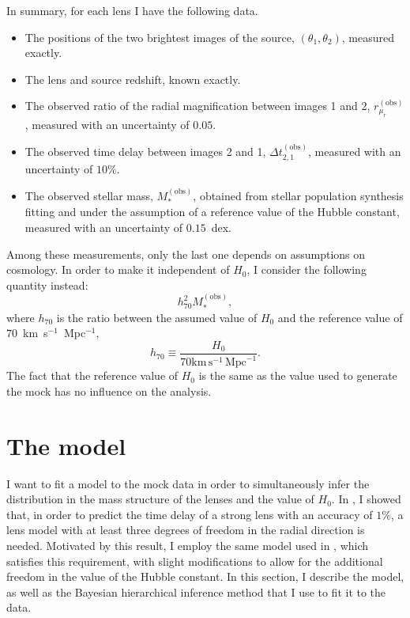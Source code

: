 \documentclass{aa}
\def\mobs{M_*^{\mathrm{(obs)}}}
\def\rmurobs{r_{\mu_r}^{(\mathrm{obs})}}
\begin{document}
In summary, for each lens I have the following data.
\begin{itemize}
\item The positions of the two brightest images of the source, $(\theta_1, \theta_2)$, measured exactly.
\item The lens and source redshift, known exactly.
\item The observed ratio of the radial magnification between images 1 and 2, $\rmurobs$, measured with an uncertainty of $0.05$.
\item The observed time delay between images 2 and 1, $\Delta t_{2,1}^{(\mathrm{obs})}$, measured with an uncertainty of $10\%$.
\item The observed stellar mass, $\mobs$, obtained from stellar population synthesis fitting and under the assumption of a reference value of the Hubble constant, measured with an uncertainty of $0.15$~dex.
\end{itemize}
Among these measurements, only the last one depends on assumptions on cosmology. In order to make it independent of $H_0$, I consider the following quantity instead:
\begin{equation}
h_{70}^2\mobs,
\end{equation}
where $h_{70}$ is the ratio between the assumed value of $H_0$ and the reference value of $70$~km~s$^{-1}$~Mpc$^{-1}$,
\begin{equation}
h_{70} \equiv \frac{H_0}{70\mathrm{km}\,\mathrm{s}^{-1}\,\mathrm{Mpc}^{-1}}.
\end{equation}
The fact that the reference value of $H_0$ is the same as the value used to generate the mock has no influence on the analysis.


\section{The model}\label{sect:model}

I want to fit a model to the mock data in order to simultaneously infer the distribution in the mass structure of the lenses and the value of $H_0$.
In \citet{Son18}, I showed that, in order to predict the time delay of a strong lens with an accuracy of $1\%$, a lens model with at least three degrees of freedom in the radial direction is needed.
Motivated by this result, I employ the same model used in , which satisfies this requirement, with slight modifications to allow for the additional freedom in the value of the Hubble constant.
In this section, I describe the model, as well as the Bayesian hierarchical inference method that I use to fit it to the data.
\end{document}
